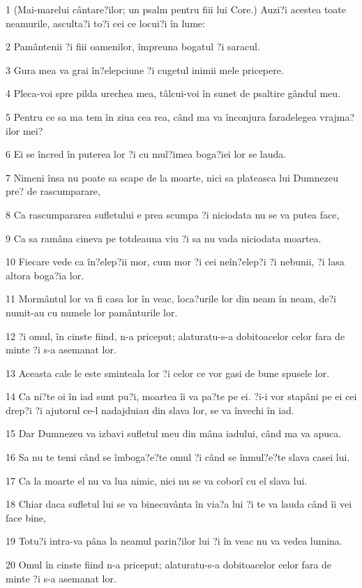 \par 1 (Mai-marelui cântare?ilor; un psalm pentru fiii lui Core.) Auzi?i acestea toate neamurile, asculta?i to?i cei ce locui?i în lume:
\par 2 Pamântenii ?i fiii oamenilor, împreuna bogatul ?i saracul.
\par 3 Gura mea va grai în?elepciune ?i cugetul inimii mele pricepere.
\par 4 Pleca-voi spre pilda urechea mea, tâlcui-voi în sunet de psaltire gândul meu.
\par 5 Pentru ce sa ma tem în ziua cea rea, când ma va înconjura faradelegea vrajma?ilor mei?
\par 6 Ei se încred în puterea lor ?i cu mul?imea boga?iei lor se lauda.
\par 7 Nimeni însa nu poate sa scape de la moarte, nici sa plateasca lui Dumnezeu pre? de rascumparare,
\par 8 Ca rascumpararea sufletului e prea scumpa ?i niciodata nu se va putea face,
\par 9 Ca sa ramâna cineva pe totdeauna viu ?i sa nu vada niciodata moartea.
\par 10 Fiecare vede ca în?elep?ii mor, cum mor ?i cei neîn?elep?i ?i nebunii, ?i lasa altora boga?ia lor.
\par 11 Mormântul lor va fi casa lor în veac, loca?urile lor din neam în neam, de?i numit-au cu numele lor pamânturile lor.
\par 12 ?i omul, în cinste fiind, n-a priceput; alaturatu-s-a dobitoacelor celor fara de minte ?i s-a asemanat lor.
\par 13 Aceasta cale le este sminteala lor ?i celor ce vor gasi de bune spusele lor.
\par 14 Ca ni?te oi în iad sunt pu?i, moartea îi va pa?te pe ei. ?i-i vor stapâni pe ei cei drep?i ?i ajutorul ce-l nadajduiau din slava lor, se va învechi în iad.
\par 15 Dar Dumnezeu va izbavi sufletul meu din mâna iadului, când ma va apuca.
\par 16 Sa nu te temi când se îmboga?e?te omul ?i când se înmul?e?te slava casei lui.
\par 17 Ca la moarte el nu va lua nimic, nici nu se va coborî cu el slava lui.
\par 18 Chiar daca sufletul lui se va binecuvânta în via?a lui ?i te va lauda când îi vei face bine,
\par 19 Totu?i intra-va pâna la neamul parin?ilor lui ?i în veac nu va vedea lumina.
\par 20 Omul în cinste fiind n-a priceput; alaturatu-s-a dobitoacelor celor fara de minte ?i s-a asemanat lor.

